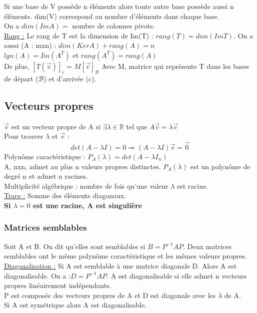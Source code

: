 \documentclass[../main.tex]{subfiles}
\begin{document}
Si une base de V possède n éléments alors toute autre base possède aussi n éléments. dim(V) correspond au nombre d'éléments dans chaque base. \\
On a $dim(Im A) =$ nombre de colonnes pivots.\\

\quad \underline{Rang :}
Le rang de T est la dimension de Im(T) : $rang(T) = dim(ImT)$. On a aussi (A : mxn) : $dim(KerA) + rang(A) = n$\\
$lgn(A) = Im(A^T)$ et $rang(A^T) = rang(A)$\\
De plus, $[T(\vec{v})]_c = M[\vec{v}]_{\mathcal{B}}$ Avec M, matrice qui représente T dans les bases de départ ($\mathcal{B}$) et d'arrivée (c).\\

\subsection{Vecteurs propres}
$\vec{v}$ est un vecteur propre de A si $\exists  \lambda \in \mathbb{R}$ tel que $A\vec{v} = \lambda \vec{v}$\\
Pour trouver $\lambda$ et $\vec{v}$ : \begin{equation}
    det(A-\lambda I) = 0 \Rightarrow (A-\lambda I) \vec{v} = \vec{0}
\end{equation}
Polynôme caractéristique : $P_A(\lambda) = det(A-\lambda I_n)$\\
A, nxn, admet au plus n valeurs propres distinctes. $P_A(\lambda)$ est un polynôme de degré n et admet n racines.\\
Multiplicité algébrique : nombre de fois qu'une valeur $\lambda$ est racine.\\

\quad \underline{Trace :}
Somme des éléments diagonaux. \\

\textbf{Si $\lambda = 0$ est une racine, A est singulière}

\subsubsection{Matrices semblables}
Soit A et B. On dit qu'elles sont semblables si $B = P^{-1}AP$. Deux matrices semblables ont le même polynôme caractéristique et les mêmes valeurs propres.\\


\quad \underline{Diagonalisation :}
Si A est semblable à une matrice diagonale D. Alors A est diagonalisable. On a :$D = P^{-1}AP$. A est diagonalisable si elle admet n vecteurs propres linéairement indépendants. \\
P est composée des vecteurs propres de A et D est diagonale avec les $\lambda$ de A. \\
Si A est symétrique alors A est diagonalisable.\\
\end{document}
